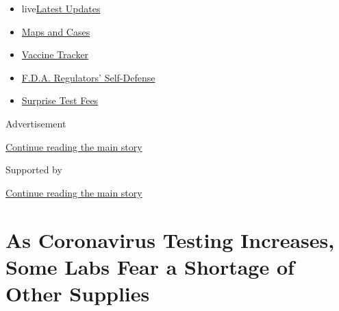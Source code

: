 \begin{itemize}
\tightlist
\item
  live\href{https://www.nytimes3xbfgragh.onion/2020/09/11/world/covid-19-coronavirus.html?name=styln-coronavirus-national\&region=TOP_BANNER\&block=storyline_menu_recirc\&action=click\&pgtype=Article\&impression_id=46383530-f4b8-11ea-b140-7b2ff790d7ab\&variant=undefined}{Latest
  Updates}
\item
  \href{https://www.nytimes3xbfgragh.onion/interactive/2020/us/coronavirus-us-cases.html?name=styln-coronavirus-national\&region=TOP_BANNER\&block=storyline_menu_recirc\&action=click\&pgtype=Article\&impression_id=46383531-f4b8-11ea-b140-7b2ff790d7ab\&variant=undefined}{Maps
  and Cases}
\item
  \href{https://www.nytimes3xbfgragh.onion/interactive/2020/science/coronavirus-vaccine-tracker.html?name=styln-coronavirus-national\&region=TOP_BANNER\&block=storyline_menu_recirc\&action=click\&pgtype=Article\&impression_id=46383532-f4b8-11ea-b140-7b2ff790d7ab\&variant=undefined}{Vaccine
  Tracker}
\item
  \href{https://www.nytimes3xbfgragh.onion/2020/09/10/us/politics/fda-coronavirus-vaccine.html?name=styln-coronavirus-national\&region=TOP_BANNER\&block=storyline_menu_recirc\&action=click\&pgtype=Article\&impression_id=46383533-f4b8-11ea-b140-7b2ff790d7ab\&variant=undefined}{F.D.A.
  Regulators' Self-Defense}
\item
  \href{https://www.nytimes3xbfgragh.onion/2020/09/09/upshot/coronavirus-surprise-test-fees.html?name=styln-coronavirus-national\&region=TOP_BANNER\&block=storyline_menu_recirc\&action=click\&pgtype=Article\&impression_id=46383534-f4b8-11ea-b140-7b2ff790d7ab\&variant=undefined}{Surprise
  Test Fees}
\end{itemize}

Advertisement

\protect\hyperlink{after-top}{Continue reading the main story}

Supported by

\protect\hyperlink{after-sponsor}{Continue reading the main story}

\hypertarget{as-coronavirus-testing-increases-some-labs-fear-a-shortage-of-other-supplies}{%
\section{As Coronavirus Testing Increases, Some Labs Fear a Shortage of
Other
Supplies}\label{as-coronavirus-testing-increases-some-labs-fear-a-shortage-of-other-supplies}}

